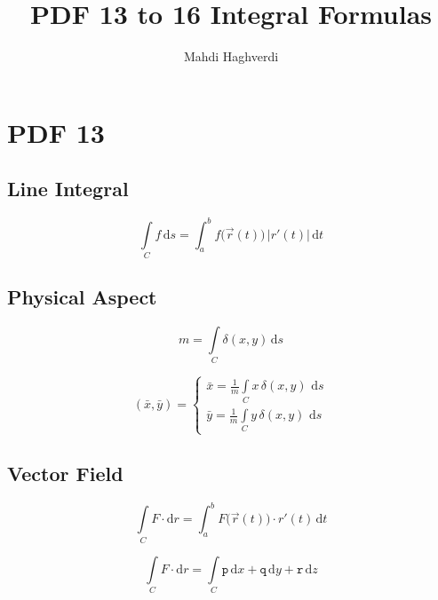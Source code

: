 \documentclass[12pt, fleqn]{book}
\title{PDF 13 to 16 Integral Formulas}
\author{Mahdi Haghverdi}
\begin{document}
	\maketitle
	\tableofcontents
	
\chapter{PDF 13}\label{pdf13}
	\section{Line Integral}
	\begin{equation}
		\int\limits_C f \, \mathrm{d}s = \int_{a}^{b} f\big(\vec{r}(t)\big) \, \lvert r'(t) \lvert \, \mathrm{d}t
	\end{equation}		

	\section{Physical Aspect}
		\begin{equation}
			m = \int\limits_C \delta (x, y) \, \mathrm{d}s
		\end{equation}
		
		\begin{equation}
			(\bar{x}, \bar{y}) = 
			\begin{cases}
					\bar{x} = \frac{1}{m} \int\limits_C x \, \delta(x, y) \, \, \mathrm{d}s \\
					\bar{y} = \frac{1}{m} \int\limits_C y \, \delta(x, y) \, \, \mathrm{d}s
			\end{cases}
		\end{equation}
	
	\section{Vector Field}
		\begin{equation}
			\int\limits_C F \cdot \mathrm{d}r = \int_{a}^{b} F\big(\vec{r}(t)\big) \cdot r'(t) \, \mathrm{d}t
		\end{equation}
		
		\begin{equation}
			\int\limits_C F \cdot \mathrm{d}r = \int\limits_C \mathtt{p} \, \mathrm{d}x + \mathtt{q} \, \mathrm{d}y + \mathtt{r} \, \mathrm{d}z
		\end{equation}    
\end{document}
